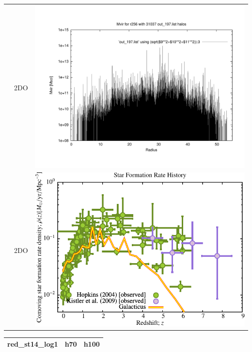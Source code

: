 \begin{itemize}
\begin{table}[p]
\begin{tabular}{l|c|c}
 & 2DO & \includegraphics[scale=0.25]{r256/h100/stages14_ling/plot_mvir_out_197.pdf} \\
 & 2DO & \includegraphics[scale=0.5]{r256/h100/stages14_ling/Plot_Star_Formation_History.pdf} \\
\end{tabular}
\end{table}
\begin{table}[p]
\centering
\begin{tabular}{l|c|c}
red\_st14\_log1 & h70 & h100 \\
\hline 

\end{tabular}
\end{table}
\end{itemize}
